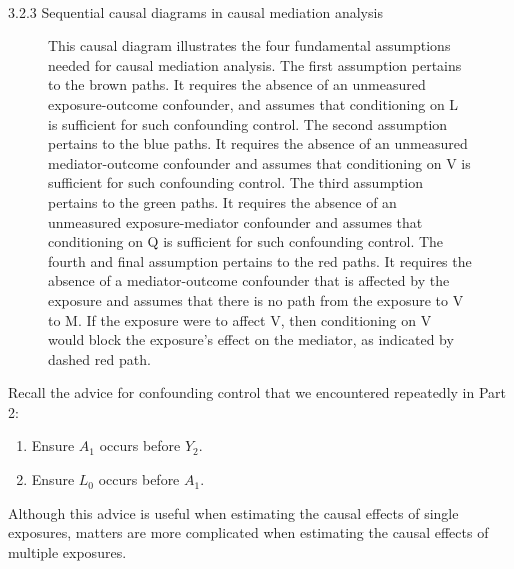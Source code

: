 \documentclass[
  singlecolumn]{article}
\makeatletter
\let\oldparagraph\paragraph
\renewcommand{\paragraph}{
    \@ifstar
      \xxxParagraphStar
      \xxxParagraphNoStar
  }
\newcommand{\xxxParagraphStar}[1]{\oldparagraph*{#1}\mbox{}}
\newcommand{\xxxParagraphNoStar}[1]{\oldparagraph{#1}\mbox{}}
\providecommand{\tightlist}{%
  \setlength{\itemsep}{0pt}\setlength{\parskip}{0pt}}\usepackage{longtable,booktabs,array}
\makeatother
\begin{document}
\paragraph{3.2.3 Sequential causal diagrams in causal mediation
analysis}\label{sequential-causal-diagrams-in-causal-mediation-analysis}

\begin{figure}


\caption{\label{fig-dag-mediation-assumptions}This causal diagram
illustrates the four fundamental assumptions needed for causal mediation
analysis. The first assumption pertains to the brown paths. It requires
the absence of an unmeasured exposure-outcome confounder, and assumes
that conditioning on L is sufficient for such confounding control. The
second assumption pertains to the blue paths. It requires the absence of
an unmeasured mediator-outcome confounder and assumes that conditioning
on V is sufficient for such confounding control. The third assumption
pertains to the green paths. It requires the absence of an unmeasured
exposure-mediator confounder and assumes that conditioning on Q is
sufficient for such confounding control. The fourth and final assumption
pertains to the red paths. It requires the absence of a mediator-outcome
confounder that is affected by the exposure and assumes that there is no
path from the exposure to V to M. If the exposure were to affect V, then
conditioning on V would block the exposure's effect on the mediator, as
indicated by dashed red path.}

\end{figure}%

Recall the advice for confounding control that we encountered repeatedly
in Part 2:

\begin{enumerate}
\def\labelenumi{\arabic{enumi}.}
\tightlist
\item
  Ensure \(A_1\) occurs before \(Y_2\).
\item
  Ensure \(L_0\) occurs before \(A_1\).
\end{enumerate}

Although this advice is useful when estimating the causal effects of
single exposures, matters are more complicated when estimating the
causal effects of multiple exposures.
\end{document}
